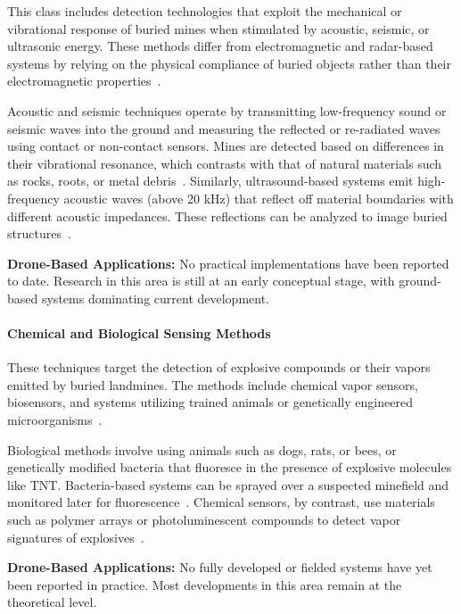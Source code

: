 This class includes detection technologies that exploit the mechanical or vibrational response of buried mines when stimulated by acoustic, seismic, or ultrasonic energy. These methods differ from electromagnetic and radar-based systems by relying on the physical compliance of buried objects rather than their electromagnetic properties~\cite{Gooneratne2004ARO,gichd2006guidebook}.

Acoustic and seismic techniques operate by transmitting low-frequency sound or seismic waves into the ground and measuring the reflected or re-radiated waves using contact or non-contact sensors. Mines are detected based on differences in their vibrational resonance, which contrasts with that of natural materials such as rocks, roots, or metal debris~\cite{gichd2006guidebook}. Similarly, ultrasound-based systems emit high-frequency acoustic waves (above 20 kHz) that reflect off material boundaries with different acoustic impedances. These reflections can be analyzed to image buried structures~\cite{paik2002image,cardonalandmine}.


\textbf{Drone-Based Applications:} No practical implementations have been reported to date. Research in this area is still at an early conceptual stage, with ground-based systems dominating current development.

\paragraph{Chemical and Biological Sensing Methods}

These techniques target the detection of explosive compounds or their vapors emitted by buried landmines. The methods include chemical vapor sensors, biosensors, and systems utilizing trained animals or genetically engineered microorganisms~\cite{Gooneratne2004ARO,alqudsi2021review}.

Biological methods involve using animals such as dogs, rats, or bees, or genetically modified bacteria that fluoresce in the presence of explosive molecules like TNT. Bacteria-based systems can be sprayed over a suspected minefield and monitored later for fluorescence~\cite{cardonalandmine}. Chemical sensors, by contrast, use materials such as polymer arrays or photoluminescent compounds to detect vapor signatures of explosives~\cite{alqudsi2021review}.


\textbf{Drone-Based Applications:} No fully developed or fielded systems have yet been reported in practice. Most developments in this area remain at the theoretical level.


